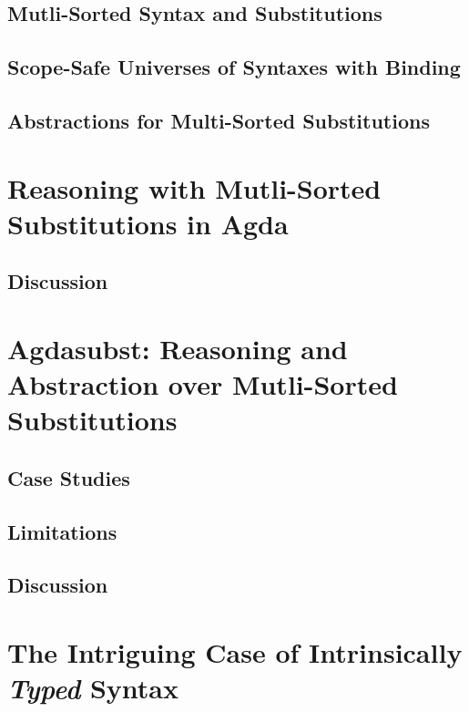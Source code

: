 \documentclass[screen,nonacm]{acmart}
\begin{document}
\subsection{Mutli-Sorted Syntax and Substitutions}

\subsection*{Scope-Safe Universes of Syntaxes with Binding}

\subsection*{Abstractions for Multi-Sorted Substitutions}

\section{Reasoning with Mutli-Sorted Substitutions in Agda}\label{sec:multi}

\subsection{Discussion}\label{sec:discussion-1}

\section{Agdasubst: Reasoning and Abstraction over Mutli-Sorted Substitutions}\label{sec:agdasubst}

\subsection{Case Studies}

\subsection{Limitations}\label{sec:limitations}

\subsection{Discussion}\label{sec:discussion-2}

\section{The Intriguing Case of Intrinsically \emph{Typed} Syntax}\label{sec:intrinsic}
\end{document}
